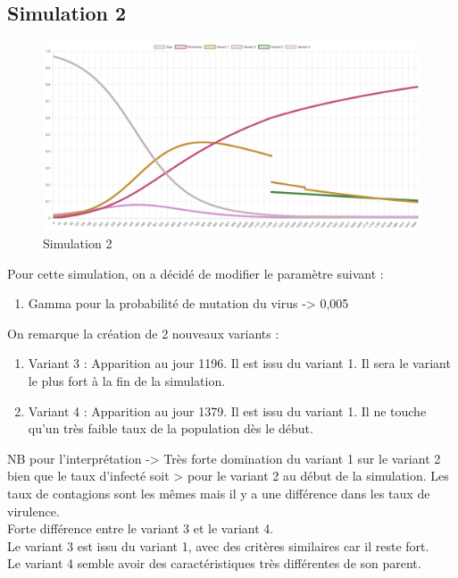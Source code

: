 \documentclass{article}
\begin{document}
\subsection{Simulation 2}

\begin{figure}[h]
    \includegraphics[width=\linewidth]{images/Simulation2.png}
    \caption{Simulation 2}
    \label{fig:simulation2}
\end{figure}

Pour cette simulation, on a décidé de modifier le paramètre suivant : 
\begin{enumerate}
    \item Gamma pour la probabilité de mutation du virus -> 0,005 \\
\end{enumerate}
\noindent
On remarque la création de 2 nouveaux variants : \\
\begin{enumerate}
    \item Variant 3 : Apparition au jour 1196. Il est issu du variant 1. Il sera le variant le plus fort à la fin de la simulation.
    \item Variant 4 : Apparition au jour 1379. Il est issu du variant 1. Il ne touche qu'un très faible taux de la population dès le début. \\
\end{enumerate}

NB pour l'interprétation -> Très forte domination du variant 1 sur le variant 2 bien que le taux d'infecté soit > pour le variant 2 au début de la simulation. Les taux de contagions sont les mêmes mais il y a une différence dans les taux de virulence. \\
Forte différence entre le variant 3 et le variant 4. \\ Le variant 3 est issu du variant 1, avec des critères similaires car il reste fort. \\ Le variant 4 semble avoir des caractéristiques très différentes de son parent. \\ 
\end{document}
